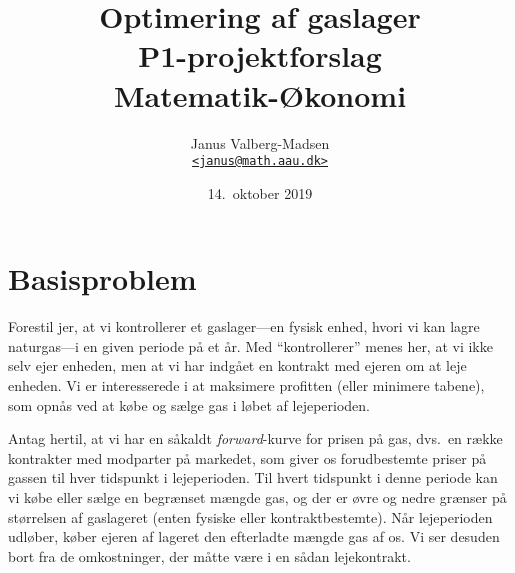 \documentclass[12pt,a4paper,oneside,final]{article}
\title{
  Optimering af gaslager\\
  \large P1-projektforslag \\
  Matematik-{\O}konomi
}
\author{
  Janus Valberg-Madsen\\
  \href{mailto:janus@math.aau.dk}{\texttt{<janus@math.aau.dk>}}
}
\date{14.\ oktober 2019}
\begin{document}
\maketitle

\begin{center}
  
\end{center}

\tableofcontents


\clearpage
\section{Basisproblem}
Forestil jer, at vi kontrollerer et gaslager---en fysisk enhed, hvori vi kan lagre naturgas---i en given periode på et år.
Med ``kontrollerer'' menes her, at vi ikke selv ejer enheden, men at vi har indgået en kontrakt med ejeren om at leje enheden.
Vi er interesserede i at maksimere profitten (eller minimere tabene), som opnås ved at købe og sælge gas i løbet af lejeperioden.

Antag hertil, at vi har en såkaldt \emph{forward}-kurve for prisen på gas, dvs.\ en række kontrakter med modparter på markedet, som giver os forudbestemte priser på gassen til hver tidspunkt i lejeperioden.
Til hvert tidspunkt i denne periode kan vi købe eller sælge en begrænset mængde gas, og der er øvre og nedre grænser på størrelsen af gaslageret (enten fysiske eller kontraktbestemte).
Når lejeperioden udløber, køber ejeren af lageret den efterladte mængde gas af os.
Vi ser desuden bort fra de omkostninger, der måtte være i en sådan lejekontrakt.
\end{document}
